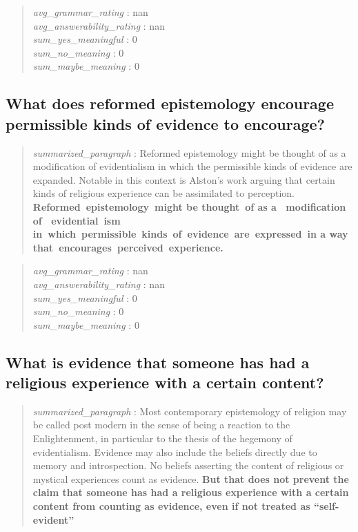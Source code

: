 \begin{quote}
\emph{avg\_grammar\_rating} : nan\\
\emph{avg\_answerability\_rating} : nan\\
\emph{sum\_yes\_meaningful} : 0\\
\emph{sum\_no\_meaning} : 0\\
\emph{sum\_maybe\_meaning} : 0
\end{quote}

\hypertarget{what-does-reformed-epistemology-encourage-permissible-kinds-of-evidence-to-encourage}{%
\subsection{What does reformed epistemology encourage permissible kinds
of evidence to
encourage?}\label{what-does-reformed-epistemology-encourage-permissible-kinds-of-evidence-to-encourage}}

\begin{quote}
\emph{summarized\_paragraph} : Reformed epistemology might be thought of
as a modification of evidentialism in which the permissible kinds of
evidence are expanded. Notable in this context is Alston's work arguing
that certain kinds of religious experience can be assimilated to
perception. \textbf{Reformed~epistemology~might be thought~of as a~
modification of~ evidential~ism
in~which~permissible~kinds~of~evidence~are~expressed~in a way
that~encourages~perceived~experience.}
\end{quote}

\begin{quote}
\emph{avg\_grammar\_rating} : nan\\
\emph{avg\_answerability\_rating} : nan\\
\emph{sum\_yes\_meaningful} : 0\\
\emph{sum\_no\_meaning} : 0\\
\emph{sum\_maybe\_meaning} : 0
\end{quote}

\hypertarget{what-is-evidence-that-someone-has-had-a-religious-experience-with-a-certain-content}{%
\subsection{What is evidence that someone has had a religious experience
with a certain
content?}\label{what-is-evidence-that-someone-has-had-a-religious-experience-with-a-certain-content}}

\begin{quote}
\emph{summarized\_paragraph} : Most contemporary epistemology of
religion may be called post modern in the sense of being a reaction to
the Enlightenment, in particular to the thesis of the hegemony of
evidentialism. Evidence may also include the beliefs directly due to
memory and introspection. No beliefs asserting the content of religious
or mystical experiences count as evidence. \textbf{But that does not
prevent the claim that someone has had a religious experience with a
certain content from counting as evidence, even if not treated as
``self-evident''}
\end{quote}

